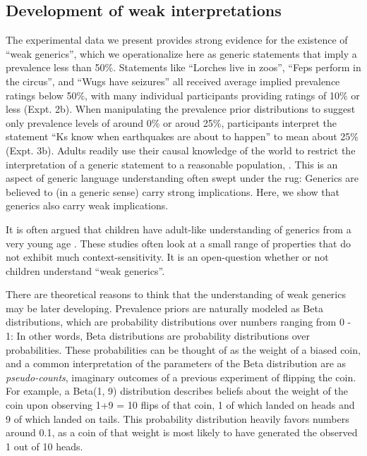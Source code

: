 \documentclass[floatsintext,man]{apa6}
\theoremstyle{definition}
\theoremstyle{definition}
\theoremstyle{definition}
\theoremstyle{remark}
\begin{document}
\subsection{Development of weak
interpretations}\label{development-of-weak-interpretations}

The experimental data we present provides strong evidence for the
existence of \enquote{weak generics}, which we operationalize here as
generic statements that imply a prevalence less than 50\%. Statements
like \enquote{Lorches live in zoos}, \enquote{Feps perform in the
circus}, and \enquote{Wugs have seizures} all received average implied
prevalence ratings below 50\%, with many individual participants
providing ratings of 10\% or less (Expt. 2b). When manipulating the
prevalence prior distributions to suggest only prevalence levels of
around 0\% or aroud 25\%, participants interpret the statement
\enquote{Ks know when earthquakes are about to happen} to mean about
25\% (Expt. 3b). Adults readily use their causal knowledge of the world
to restrict the interpretation of a generic statement to a reasonable
population, . This is an aspect
of generic language understanding often swept under the rug: Generics
are believed to (in a generic sense) carry strong implications. Here, we
show that generics also carry weak implications.

It is often argued that children have adult-like understanding of
generics from a very young age
. These studies often look
at a small range of properties that do not exhibit much
context-sensitivity. It is an open-question whether or not children
understand \enquote{weak generics}.

There are theoretical reasons to think that the understanding of weak
generics may be later developing. Prevalence priors are naturally
modeled as Beta distributions, which are probability distributions over
numbers ranging from 0 - 1: In other words, Beta distributions are
probability distributions over probabilities. These probabilities can be
thought of as the weight of a biased coin, and a common interpretation
of the parameters of the Beta distribution are as \emph{pseudo-counts},
imaginary outcomes of a previous experiment of flipping the coin. For
example, a Beta(1, 9) distribution describes beliefs about the weight of
the coin upon observing 1+9 = 10 flips of that coin, 1 of which landed
on heads and 9 of which landed on tails. This probability distribution
heavily favors numbers around 0.1, as a coin of that weight is most
likely to have generated the observed 1 out of 10 heads.
\end{document}
